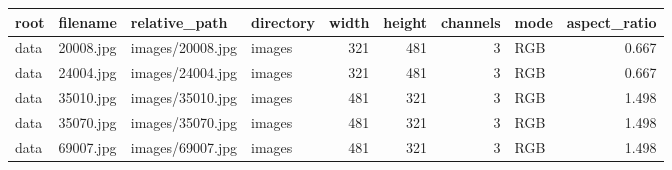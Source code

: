 \begin{tabular}{llllrrrlr}
\toprule
root & filename & relative\_path & directory & width & height & channels & mode & aspect\_ratio \\
\midrule
data & 20008.jpg & images/20008.jpg & images & 321 & 481 & 3 & RGB & 0.667 \\
data & 24004.jpg & images/24004.jpg & images & 321 & 481 & 3 & RGB & 0.667 \\
data & 35010.jpg & images/35010.jpg & images & 481 & 321 & 3 & RGB & 1.498 \\
data & 35070.jpg & images/35070.jpg & images & 481 & 321 & 3 & RGB & 1.498 \\
data & 69007.jpg & images/69007.jpg & images & 481 & 321 & 3 & RGB & 1.498 \\
\bottomrule
\end{tabular}
